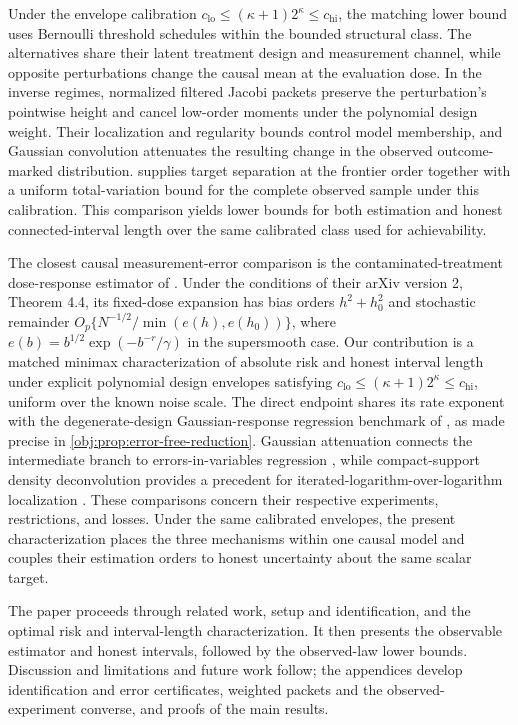 Under the envelope calibration \(c_{\mathrm{lo}}\le(\kappa+1)2^\kappa\le c_{\mathrm{hi}}\), the matching lower bound uses Bernoulli threshold schedules within the bounded structural class. The alternatives share their latent treatment design and measurement channel, while opposite perturbations change the causal mean at the evaluation dose. In the inverse regimes, normalized filtered Jacobi packets preserve the perturbation's pointwise height and cancel low-order moments under the polynomial design weight. Their localization and regularity bounds control model membership, and Gaussian convolution attenuates the resulting change in the observed outcome-marked distribution.  supplies target separation at the frontier order together with a uniform total-variation bound for the complete observed sample under this calibration. This comparison yields lower bounds for both estimation and honest connected-interval length over the same calibrated class used for achievability.

The closest causal measurement-error comparison is the contaminated-treatment dose-response estimator of \citet{HuangZhang2023}. Under the conditions of their arXiv version 2, Theorem 4.4, its fixed-dose expansion has bias orders \(h^2+h_0^2\) and stochastic remainder \(O_p\{N^{-1/2}/\min(e(h),e(h_0))\}\), where \(e(b)=b^{1/2}\exp(-b^{-r}/\gamma)\) in the supersmooth case. Our contribution is a matched minimax characterization of absolute risk and honest interval length under explicit polynomial design envelopes satisfying \(c_{\mathrm{lo}}\le(\kappa+1)2^\kappa\le c_{\mathrm{hi}}\), uniform over the known noise scale. The direct endpoint shares its rate exponent with the degenerate-design Gaussian-response regression benchmark of \citet[Definition 2 and Theorem 1]{Gaiffas2005}, as made precise in \cref{obj:prop:error-free-reduction}. Gaussian attenuation connects the intermediate branch to errors-in-variables regression \citep[Sections 3--4]{FanTruong1993}, while compact-support density deconvolution provides a precedent for iterated-logarithm-over-logarithm localization \citep[Theorems 1--2]{Meister2007}. These comparisons concern their respective experiments, restrictions, and losses. Under the same calibrated envelopes, the present characterization places the three mechanisms within one causal model and couples their estimation orders to honest uncertainty about the same scalar target.



The paper proceeds through related work, setup and identification, and the optimal risk and interval-length characterization. It then presents the observable estimator and honest intervals, followed by the observed-law lower bounds. Discussion and limitations and future work follow; the appendices develop identification and error certificates, weighted packets and the observed-experiment converse, and proofs of the main results.
